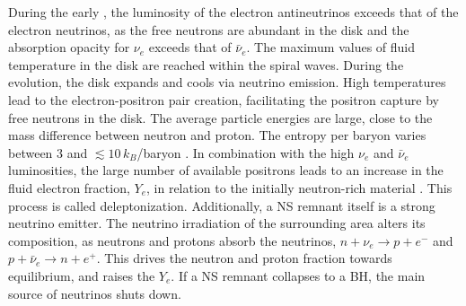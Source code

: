 During the early \pmerg{}, the luminosity of the electron antineutrinos 
exceeds that of the electron neutrinos, 
as the 
free neutrons are abundant in the disk and the absorption opacity for $\nu_e$ 
exceeds that of $\bar{\nu}_e$. 
%
The maximum values of fluid temperature in the disk are reached within 
the spiral waves. During the \pmerg{} evolution, the disk expands and 
cools via neutrino emission.
High temperatures lead to the electron-positron pair creation, 
facilitating the positron capture by free neutrons 
in the disk.
%
The average particle energies are large, close to the mass difference between 
neutron and proton. The entropy per baryon varies between $3$ and 
$\lesssim  10\,$$k_{B}$/baryon \citep{Perego:2019adq}. 
In combination with the high $\nu_e$ and $\bar{\nu}_e$ luminosities, the large number 
of available positrons leads to an increase in the fluid electron fraction, 
$Y_e$, in relation to the initially neutron-rich material \citep{Qian:1996xt}.
This process is called deleptonization. %
%
Additionally, a \ac{NS} remnant itself is a strong neutrino emitter. 
The neutrino irradiation of the surrounding area alters its composition, 
as neutrons and protons absorb the neutrinos,
$n+\nu_e\rightarrow p + e^{-}$ and $p + \bar{\nu}_e\rightarrow n + e^+$.
This drives the neutron and proton fraction towards equilibrium, and raises the $Y_e$.
If a \ac{NS} remnant collapses to a \ac{BH}, the main source of neutrinos shuts down.  







